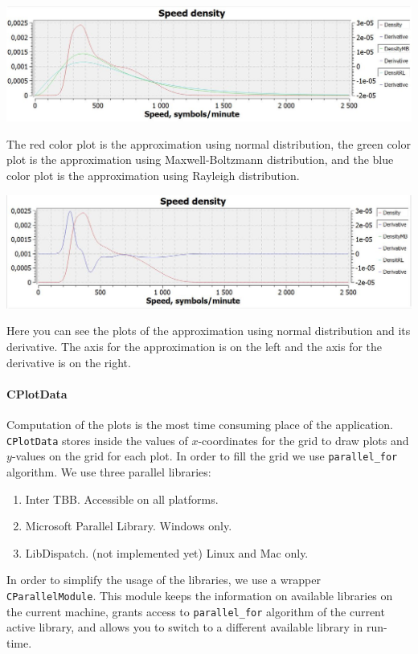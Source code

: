 \documentclass{article}
\begin{document}
\begin{center}
\includegraphics[scale = 0.6]{Figures/Density.jpg}

The red color plot is the approximation using normal distribution, the green color plot is the approximation using Maxwell-Boltzmann distribution, and the blue color plot is the approximation using Rayleigh distribution.
\end{center}
\begin{center}
\includegraphics[scale = 0.6]{Figures/DensityAndDerivative.jpg}

Here you can see the plots of the approximation using normal distribution and its derivative. The axis for the approximation is on the left and the axis for the derivative is on the right.
\end{center}


\paragraph{CPlotData}

Computation of the plots is the most time consuming place of the application. \verb"CPlotData" stores inside the values of $x$-coordinates for the grid to draw plots and $y$-values on the grid for each plot. In order to fill the grid we use \verb"parallel_for" algorithm. We use three parallel libraries:
\begin{enumerate}
\item Inter TBB. Accessible on all platforms.
\item Microsoft Parallel Library. Windows only.
\item LibDispatch. (not implemented yet) Linux and Mac only.
\end{enumerate}
In order to simplify the usage of the libraries, we use a wrapper \verb"CParallelModule". This module keeps the information on available libraries on the current machine, grants access to \verb"parallel_for" algorithm of the current active library, and allows you to switch to a different available library in run-time.
\end{document}
